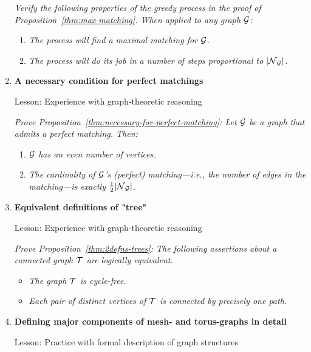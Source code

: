 \begin{enumerate}
\smallskip


{\em Verify the following properties of the greedy process in the proof of Proposition~\ref{thm:max-matching}.  When applied to any graph $\mbox{$\cal G$}$:}
  \begin{enumerate}
  \item
{\em The process will find a maximal matching for $\mbox{$\cal G$}$.}
  \medskip\item
{\em The process will do its job in a number of steps proportional to $|\mbox{$\cal N$}_{\mbox{{\scriptsize $\cal G$}}}|$.}
  \end{enumerate}

\medskip\item
{\bf A necessary condition for perfect matchings}

{\sc Lesson:} Experience with graph-theoretic reasoning

\smallskip

{\em Prove Proposition~\ref{thm:necessary-for-perfect-matching}:
Let $\mbox{$\cal G$}$ be a graph that admits a perfect matching.  Then:}
  \begin{enumerate}
  \item
{\em $\mbox{$\cal G$}$ has an even number of vertices.}
  \medskip\item
{\em The cardinality of $\mbox{$\cal G$}$'s (perfect) matching---i.e., the number of edges in the matching---is exactly $\frac{1}{2}|\mbox{$\cal N$}_{\mbox{{\scriptsize $\cal G$}}}|$.}
  \end{enumerate}

\medskip\item
{\bf Equivalent definitions of "tree"}

{\sc Lesson:} Experience with graph-theoretic reasoning

\smallskip

{\em Prove Proposition~\ref{thm:2defns-trees}:
The following assertions about a connected graph $\mbox{$\cal T$}$ are  logically equivalent.}
  \begin{itemize}
  \item
{\em The graph $\mbox{$\cal T$}$ is cycle-free.}
  \medskip\item
{\em Each pair of distinct vertices of $\mbox{$\cal T$}$ is connected by precisely one path.}
  \end{itemize}

\medskip\item
{\bf Defining major components of mesh- and torus-graphs in detail}

{\sc Lesson:} Practice with formal description of graph structures

\smallskip


\end{enumerate}
